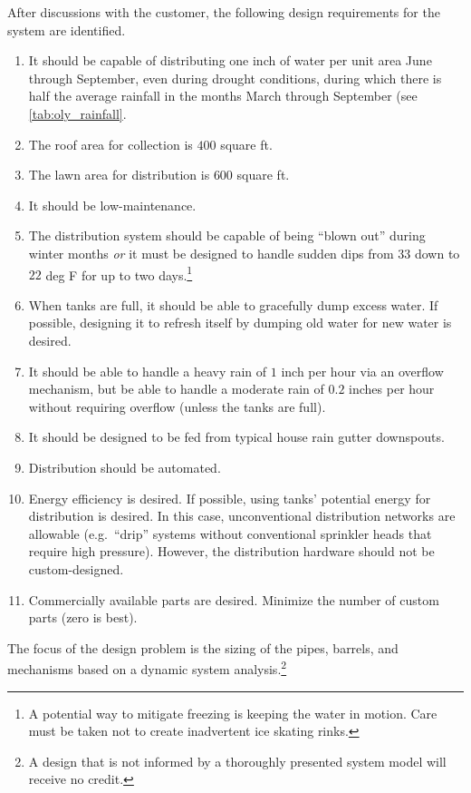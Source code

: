\documentclass[dynamic_systems.tex]{subfiles}
\begin{document}
After discussions with the customer, the following design requirements for the system are identified.
\tags{}
\begin{enumerate}
  \item It should be capable of distributing one inch of water per unit area June through September, even during drought conditions, during which there is half the average rainfall in the months March through September (see \autoref{tab:oly_rainfall}.
  \item The roof area for collection is $400$ square ft.
  \item The lawn area for distribution is $600$ square ft.
  \item It should be low-maintenance.
  \item The distribution system should be capable of being ``blown out'' during winter months \emph{or} it must be designed to handle sudden dips from $33$ down to $22$ deg F for up to two days.\footnote{A potential way to mitigate freezing is keeping the water in motion. Care must be taken not to create inadvertent ice skating rinks.}
  \item When tanks are full, it should be able to gracefully dump excess water. If possible, designing it to refresh itself by dumping old water for new water is desired.
  \item It should be able to handle a heavy rain of $1$ inch per hour via an overflow mechanism, but be able to handle a moderate rain of $0.2$ inches per hour without requiring overflow (unless the tanks are full).
  \item It should be designed to be fed from typical house rain gutter downspouts.
  \item Distribution should be automated.
  \item Energy efficiency is desired. If possible, using tanks' potential energy for distribution is desired. In this case, unconventional distribution networks are allowable (e.g.\ ``drip'' systems without conventional sprinkler heads that require high pressure). However, the distribution hardware should not be custom-designed.
  \item Commercially available parts are desired. Minimize the number of custom parts (zero is best).
\end{enumerate}

The focus of the design problem is the sizing of the pipes, barrels, and mechanisms based on a dynamic system analysis.\footnote{A design that is not informed by a thoroughly presented system model will receive no credit.}
\tags{}
\end{document}
